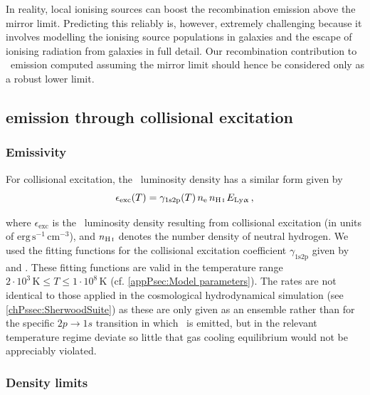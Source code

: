 In reality, local ionising sources can boost the recombination emission above the mirror limit. Predicting this reliably is, however, extremely challenging because it involves modelling the ionising source populations in galaxies and the escape of ionising radiation from galaxies in full detail. Our recombination contribution to \lya\ emission computed assuming the mirror limit should hence be considered only as a robust lower limit.

\subsection{\texorpdfstring{\lya}{\lyatext} emission through collisional excitation}
\label{chPssec:Lya collisional excitation emission}

\subsubsection{Emissivity}
\label{chPsssec:Collisional excitation emissivity}

For collisional excitation, the \lya\ luminosity density has a similar form \citep{1990MNRAS.242..692S, 1991ApJ...380..302S, 2014PASA...31...40D, 2016MNRAS.462.1961S} given by
\begin{equation}
    \label{chPeq:Collisional excitation emissivity}
    \epsilon_\text{exc}(T) = \gamma_\text{1s2p} (T) \, n_\text{e} \, n_\text{\ion{H}{I}} \, E_\text{\lya} \, ,
\end{equation}

\noindent where $\epsilon_\text{exc}$ is the \lya\ luminosity density resulting from collisional excitation (in units of $\mathrm{erg \, s^{-1} \, cm^{-3}}$), and $n_\text{\ion{H}{I}}$ denotes the number density of neutral hydrogen. We used the fitting functions for the collisional excitation coefficient $\gamma_\text{1s2p}$ given by \citet{1990MNRAS.242..692S} and \citet{1991ApJ...380..302S}. These fitting functions are valid in the temperature range $2 \cdot 10^3 \, \mathrm{K} \leq T \leq 1 \cdot 10^8 \, \mathrm{K}$ (cf. \cref{appPsec:Model parameters}). The rates are not identical to those applied in the cosmological hydrodynamical simulation (see \cref{chPssec:SherwoodSuite}) as these are only given as an ensemble rather than for the specific $2p \rightarrow 1s$ transition in which \lya\ is emitted, but in the relevant temperature regime deviate so little that gas cooling equilibrium would not be appreciably violated.

\subsubsection{Density limits}
\label{chPsssec:Density limits}

